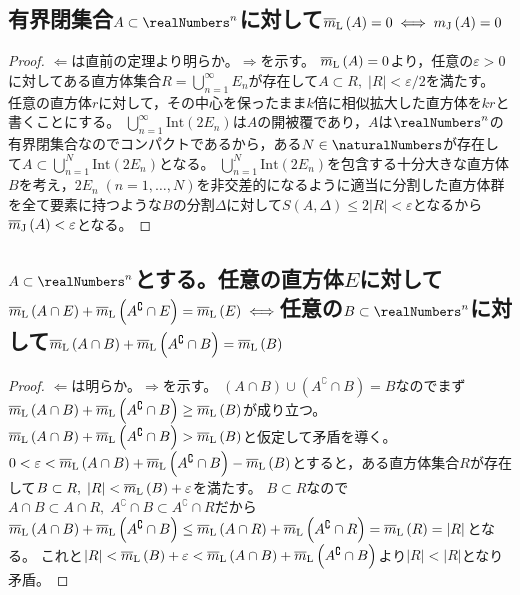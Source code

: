         \subsection{有界閉集合\texorpdfstring{$A\subset\realNumbers^n$}{A⊂R\string^n}に対して\texorpdfstring{$\protect\overline{m}_\textrm{L}\left(A\right)=0 \iff m_\textrm{J}\left(A\right)=0$}{AのLebesgue外測度=0 ⇔ AのJordan外測度}}
            \begin{proof}
                \quad\par
                $\Leftarrow$は直前の定理より明らか。$\Rightarrow$を示す。
                $\protect\overline{m}_\textrm{L}\left(A\right)=0$より，任意の$\varepsilon>0$に対してある直方体集合$R=\bigcup_{n=1}^\infty E_n$が存在して$A\subset R,\;|R|<\varepsilon/2$を満たす。
                任意の直方体$r$に対して，その中心を保ったまま$k$倍に相似拡大した直方体を$kr$と書くことにする。
                $\bigcup_{n=1}^\infty \textrm{Int}(2E_n)$は$A$の開被覆であり，$A$は$\realNumbers^n$の有界閉集合なのでコンパクトであるから，ある$N\in\naturalNumbers$が存在して$A\subset \bigcup_{n=1}^N \textrm{Int}(2E_n)$となる。
                $\bigcup_{n=1}^N \textrm{Int}(2E_n)$を包含する十分大きな直方体$B$を考え，$2E_n\;(n=1,\dotsc,N)$を非交差的になるように適当に分割した直方体群を全て要素に持つような$B$の分割$\Delta$に対して$S(A,\Delta) \leq 2|R| <\varepsilon$となるから$\protect\overline{m}_\textrm{J}\left(A\right)<\varepsilon$となる。
            \end{proof}
        \subsection{\texorpdfstring{$A\subset\realNumbers^n$}{A⊂R\string^n}とする。任意の直方体\texorpdfstring{$E$}{E}に対して\texorpdfstring{$\protect\overline{m}_\textrm{L}\left(A\cap E\right) + \protect\overline{m}_\textrm{L}\left(A^\complement\cap E\right) = \protect\overline{m}_\textrm{L}\left(E\right) \iff$}{mLo(A∩E) + mLo(A\string^C E) = mLo(E) ⇔}任意の\texorpdfstring{$B\subset\realNumbers^n$}{B⊂R\string^n}に対して\texorpdfstring{$\protect\overline{m}_\textrm{L}\left(A\cap B\right) + \protect\overline{m}_\textrm{L}\left(A^\complement\cap B\right) = \protect\overline{m}_\textrm{L}\left(B\right)$}{mLebo(A∩B) + mLo(A\string^C ∩B)}}
            \begin{proof}
                \quad\par
                $\Leftarrow$は明らか。$\Rightarrow$を示す。
                $(A\cap B)\cup(A^\complement\cap B) = B$なのでまず$\protect\overline{m}_\textrm{L}\left(A\cap B\right) + \protect\overline{m}_\textrm{L}\left(A^\complement\cap B\right) \geq \protect\overline{m}_\textrm{L}\left(B\right)$が成り立つ。
                $\protect\overline{m}_\textrm{L}\left(A\cap B\right) + \protect\overline{m}_\textrm{L}\left(A^\complement\cap B\right) > \protect\overline{m}_\textrm{L}\left(B\right)$と仮定して矛盾を導く。
                $0<\varepsilon < \protect\overline{m}_\textrm{L}\left(A\cap B\right) + \protect\overline{m}_\textrm{L}\left(A^\complement\cap B\right) - \protect\overline{m}_\textrm{L}\left(B\right)$とすると，ある直方体集合$R$が存在して$B\subset R,\;|R| < \protect\overline{m}_\textrm{L}\left(B\right)+\varepsilon$を満たす。
                $B\subset R$なので$A\cap B\subset A\cap R,\;A^\complement\cap B\subset A^\complement\cap R$だから$\protect\overline{m}_\textrm{L}\left(A\cap B\right) + \protect\overline{m}_\textrm{L}\left(A^\complement\cap B\right) \leq \protect\overline{m}_\textrm{L}\left(A\cap R\right) + \protect\overline{m}_\textrm{L}\left(A^\complement\cap R\right) = \protect\overline{m}_\textrm{L}\left(R\right) = |R|$となる。
                これと$|R| < \protect\overline{m}_\textrm{L}\left(B\right)+\varepsilon < \protect\overline{m}_\textrm{L}\left(A\cap B\right) + \protect\overline{m}_\textrm{L}\left(A^\complement\cap B\right)$より$|R|<|R|$となり矛盾。
            \end{proof}
